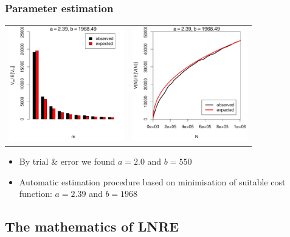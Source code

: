 \documentclass[t]{beamer} %
\begin{document}
\begin{frame}[c]
  \frametitle{Parameter estimation}

  \begin{center}
    \begin{tabular}{c @{} c}
      \includegraphics[width=50mm]{img/05-estimation-spc-estimated} &
      \includegraphics[width=50mm]{img/05-estimation-vgc-estimated} 
    \end{tabular}
  \end{center}

  \ungap[1]
  \begin{itemize}
    \item By trial \& error we found $a=2.0$ and $b=550$
    \item Automatic estimation procedure based on minimisation of suitable cost function: $a=2.39$ and $b=1968$
  \end{itemize}
\end{frame}

\subsection{The mathematics of LNRE}
\end{document}
